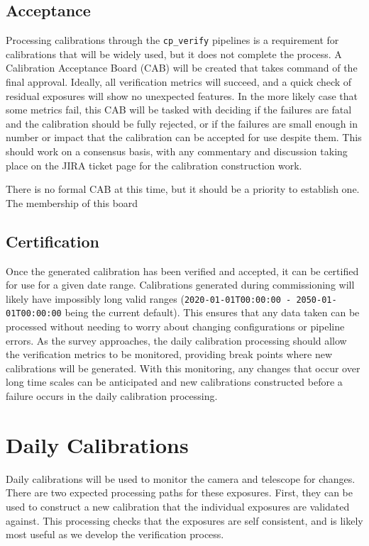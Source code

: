 \documentclass[DM,authoryear,toc]{lsstdoc}
\begin{document}
\subsection{Acceptance}

Processing calibrations through the \verb|cp_verify| pipelines is a requirement for calibrations that will be widely used, but it does not complete the process.  A Calibration Acceptance Board (CAB) will be created that takes command of the final approval.  Ideally, all verification metrics will succeed, and a quick check of residual exposures will show no unexpected features.  In the more likely case that some metrics fail, this CAB will be tasked with deciding if the failures are fatal and the calibration should be fully rejected, or if the failures are small enough in number or impact that the calibration can be accepted for use despite them.  This should work on a consensus basis, with any commentary and discussion taking place on the JIRA ticket page for the calibration construction work.

There is no formal CAB at this time, but it should be a priority to establish one.  The membership of this board 

\subsection{Certification}

Once the generated calibration has been verified and accepted, it can be certified for use for a given date range.  Calibrations generated during commissioning will likely have impossibly long valid ranges (\verb|2020-01-01T00:00:00 - 2050-01-01T00:00:00| being the current default). This ensures that any data taken can be processed without needing to worry about changing configurations or pipeline errors.   As the survey approaches, the daily calibration processing should allow the verification metrics to be monitored, providing break points where new calibrations will be generated.  With this monitoring, any changes that occur over long time scales can be anticipated and new calibrations constructed before a failure occurs in the daily calibration processing.

\section{Daily Calibrations}

Daily calibrations will be used to monitor the camera and telescope for changes.  There are two expected processing paths for these exposures.  First, they can be used to construct a new calibration that the individual exposures are validated against.  This processing checks that the exposures are self consistent, and is likely most useful as we develop the verification process.
\end{document}
